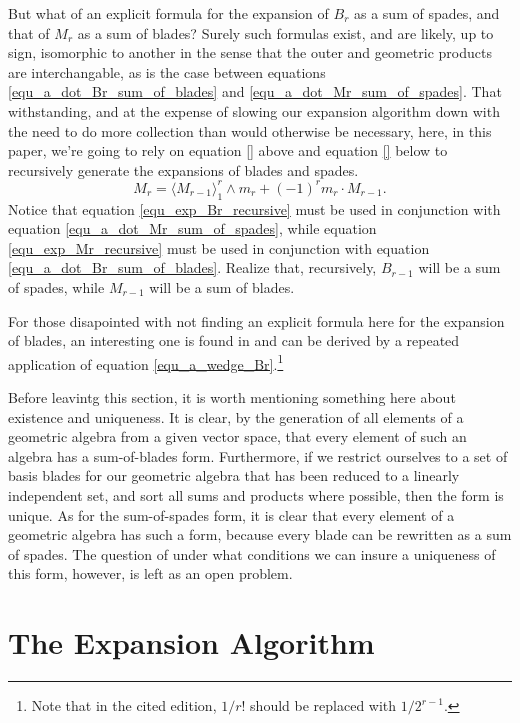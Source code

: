 \documentclass{birkjour}
\theoremstyle{definition}
\theoremstyle{remark}
\numberwithin{equation}{section}
\begin{document}
But what of an explicit formula for the expansion of $B_r$ as a sum of spades, and that of $M_r$ as a sum of blades?
Surely such formulas exist, and are likely, up to sign, isomorphic to another in the sense that the outer and geometric products
are interchangable, as is the case between equations \eqref{equ_a_dot_Br_sum_of_blades} and \eqref{equ_a_dot_Mr_sum_of_spades}.
That withstanding, and at the expense of slowing our expansion
algorithm down with the need to do more collection than would otherwise be necessary, here, in this paper, we're going to rely on equation \eqref{} above and
equation \eqref{} below to recursively generate the expansions of blades and spades.
\begin{equation}\label{equ_exp_Mr_recursive}
M_r = \langle M_{r-1}\rangle_1^r\wedge m_r + (-1)^rm_r \cdot M_{r-1}.
\end{equation}
Notice that equation \eqref{equ_exp_Br_recursive} must be used in conjunction with equation \eqref{equ_a_dot_Mr_sum_of_spades}, while
equation \eqref{equ_exp_Mr_recursive} must be used in conjunction with equation \eqref{equ_a_dot_Br_sum_of_blades}.  Realize that, recursively,
$B_{r-1}$ will be a sum of spades, while $M_{r-1}$ will be a sum of blades.

For those disapointed with not finding an explicit formula here for the expansion of blades,
an interesting one is found in \cite[p.~86]{DoranLasenby03} and can be derived by a
repeated application of equation \eqref{equ_a_wedge_Br}.\footnote{Note that in the cited edition, $1/r!$ should be replaced with $1/2^{r-1}$.}


Before leavintg this section, it is worth mentioning something here about existence and uniqueness.
It is clear, by the generation of all elements of a geometric algebra from a given vector space, that every element of such an algebra
has a sum-of-blades form.  Furthermore, if we restrict ourselves to a set of basis blades for
our geometric algebra that has been reduced to a linearly independent set, and sort all sums and products where possible,
then the form is unique.  As for the sum-of-spades form, it is
clear that every element of a geometric algebra has such a form, because every blade can be rewritten
as a sum of spades.  The question of under what conditions we can insure a uniqueness of this form, however, is
left as an open problem.

\section{The Expansion Algorithm}
\end{document}
